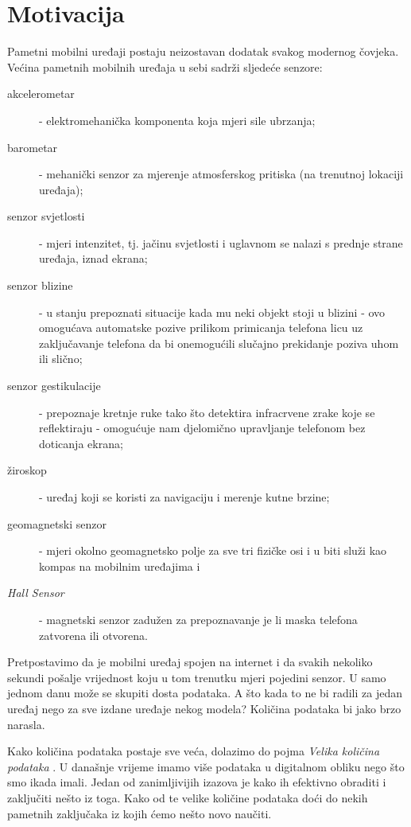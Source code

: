 \documentclass[times, utf8, zavrsni]{fer}
\begin{document}
\section{Motivacija}
Pametni mobilni uređaji postaju neizostavan dodatak svakog modernog čovjeka.\\
Većina pametnih mobilnih uređaja u sebi sadrži sljedeće senzore:
\begin{description}
	\item[akcelerometar] - elektromehanička komponenta koja mjeri sile ubrzanja;
	\item[barometar] - mehanički senzor za mjerenje atmosferskog pritiska (na trenutnoj lokaciji uređaja);
	\item[senzor svjetlosti] - mjeri intenzitet, tj. jačinu svjetlosti i uglavnom se nalazi s prednje strane uređaja, iznad ekrana;
	\item[senzor blizine] - u stanju prepoznati situacije kada mu neki objekt stoji u blizini - ovo omogućava automatske pozive prilikom primicanja telefona licu uz zaključavanje telefona da bi onemogućili slučajno prekidanje poziva uhom ili slično;
	\item[senzor gestikulacije] - prepoznaje kretnje ruke tako što detektira infracrvene zrake koje se reflektiraju - omogućuje nam djelomično upravljanje telefonom bez doticanja ekrana;
	\item[žiroskop] - uređaj koji se koristi za navigaciju i merenje kutne brzine;
	\item[geomagnetski senzor] - mjeri okolno geomagnetsko polje za sve tri fizičke osi i u biti služi kao kompas na mobilnim uređajima i 
	\item[\emph{Hall Sensor}] - magnetski senzor zadužen za prepoznavanje je li  maska telefona zatvorena ili otvorena.
\end{description}
Pretpostavimo da je mobilni uređaj spojen na internet i da svakih nekoliko sekundi pošalje vrijednost koju u tom trenutku mjeri pojedini senzor. U samo jednom danu može se skupiti dosta podataka. A što kada to ne bi radili za jedan uređaj nego za sve izdane uređaje nekog modela? Količina podataka bi jako brzo narasla.

Kako količina podataka postaje sve veća, dolazimo do pojma \emph{Velika količina podataka} . U današnje vrijeme imamo više podataka u digitalnom obliku nego što smo ikada imali. Jedan od zanimljivijih izazova je kako ih efektivno obraditi i zaključiti nešto iz toga. Kako od te velike količine podataka doći do nekih pametnih zaključaka iz kojih ćemo nešto novo naučiti.
\end{document}
